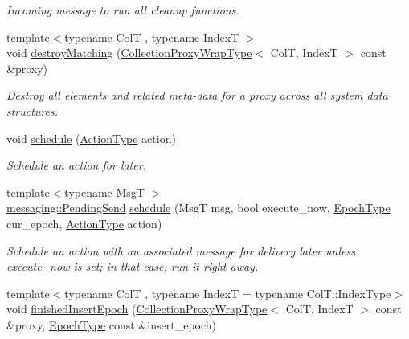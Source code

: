 \begin{DoxyCompactItemize}
\begin{DoxyCompactList}\small\item\em Incoming message to run all cleanup functions. \end{DoxyCompactList}\item 
{\footnotesize template$<$typename ColT , typename IndexT $>$ }\\void \hyperlink{structvt_1_1vrt_1_1collection_1_1_collection_manager_afac7551ce2ddeeff21631fa9e6987784}{destroy\+Matching} (\hyperlink{structvt_1_1vrt_1_1collection_1_1_collection_manager_a56458ed7f9bb22b631b9b3a745f42f94}{Collection\+Proxy\+Wrap\+Type}$<$ ColT, IndexT $>$ const \&proxy)
\begin{DoxyCompactList}\small\item\em Destroy all elements and related meta-\/data for a proxy across all system data structures. \end{DoxyCompactList}\item 
void \hyperlink{structvt_1_1vrt_1_1collection_1_1_collection_manager_a7199e829343abd7700dcdcd0a02cd477}{schedule} (\hyperlink{namespacevt_ae0a5a7b18cc99d7b732cb4d44f46b0f3}{Action\+Type} action)
\begin{DoxyCompactList}\small\item\em Schedule an action for later. \end{DoxyCompactList}\item 
{\footnotesize template$<$typename MsgT $>$ }\\\hyperlink{structvt_1_1messaging_1_1_pending_send}{messaging\+::\+Pending\+Send} \hyperlink{structvt_1_1vrt_1_1collection_1_1_collection_manager_aaa19d241c982123103147b568f97b842}{schedule} (MsgT msg, bool execute\+\_\+now, \hyperlink{namespacevt_a985a5adf291c34a3ca263b3378388236}{Epoch\+Type} cur\+\_\+epoch, \hyperlink{namespacevt_ae0a5a7b18cc99d7b732cb4d44f46b0f3}{Action\+Type} action)
\begin{DoxyCompactList}\small\item\em Schedule an action with an associated message for delivery later unless {\ttfamily execute\+\_\+now} is set; in that case, run it right away. \end{DoxyCompactList}\item 
{\footnotesize template$<$typename ColT , typename IndexT  = typename Col\+T\+::\+Index\+Type$>$ }\\void \hyperlink{structvt_1_1vrt_1_1collection_1_1_collection_manager_ac59dd2227839839776c92ca0c23934e5}{finished\+Insert\+Epoch} (\hyperlink{structvt_1_1vrt_1_1collection_1_1_collection_manager_a56458ed7f9bb22b631b9b3a745f42f94}{Collection\+Proxy\+Wrap\+Type}$<$ ColT, IndexT $>$ const \&proxy, \hyperlink{namespacevt_a985a5adf291c34a3ca263b3378388236}{Epoch\+Type} const \&insert\+\_\+epoch)

\end{DoxyCompactItemize}
